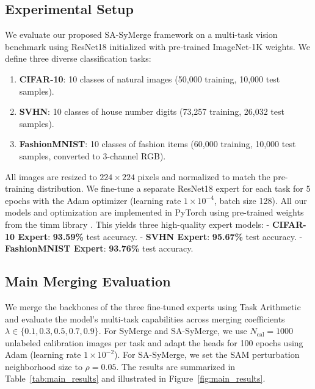 \documentclass{article}
\theoremstyle{plain}
\theoremstyle{definition}
\theoremstyle{remark}
\begin{document}
\subsection{Experimental Setup}
We evaluate our proposed SA-SyMerge framework on a multi-task vision benchmark using ResNet18 \cite{he2016deep} initialized with pre-trained ImageNet-1K weights. We define three diverse classification tasks:
\begin{enumerate}
    \item \textbf{CIFAR-10}: 10 classes of natural images (50,000 training, 10,000 test samples).
    \item \textbf{SVHN}: 10 classes of house number digits (73,257 training, 26,032 test samples).
    \item \textbf{FashionMNIST}: 10 classes of fashion items (60,000 training, 10,000 test samples, converted to 3-channel RGB).
\end{enumerate}
All images are resized to $224 \times 224$ pixels and normalized to match the pre-training distribution. We fine-tune a separate ResNet18 expert for each task for 5 epochs with the Adam optimizer \cite{kingma2014adam} (learning rate $1\times10^{-4}$, batch size 128). All our models and optimization are implemented in PyTorch \cite{paszke2019pytorch} using pre-trained weights from the timm library \cite{wightman2019timm}. This yields three high-quality expert models:
- \textbf{CIFAR-10 Expert}: \textbf{93.59\%} test accuracy.
- \textbf{SVHN Expert}: \textbf{95.67\%} test accuracy.
- \textbf{FashionMNIST Expert}: \textbf{93.76\%} test accuracy.

\subsection{Main Merging Evaluation}
We merge the backbones of the three fine-tuned experts using Task Arithmetic and evaluate the model's multi-task capabilities across merging coefficients $\lambda \in \{0.1, 0.3, 0.5, 0.7, 0.9\}$. For SyMerge and SA-SyMerge, we use $N_{\text{cal}} = 1000$ unlabeled calibration images per task and adapt the heads for 100 epochs using Adam (learning rate $1\times10^{-2}$). For SA-SyMerge, we set the SAM perturbation neighborhood size to $\rho = 0.05$. The results are summarized in Table~\ref{tab:main_results} and illustrated in Figure~\ref{fig:main_results}.
\end{document}
